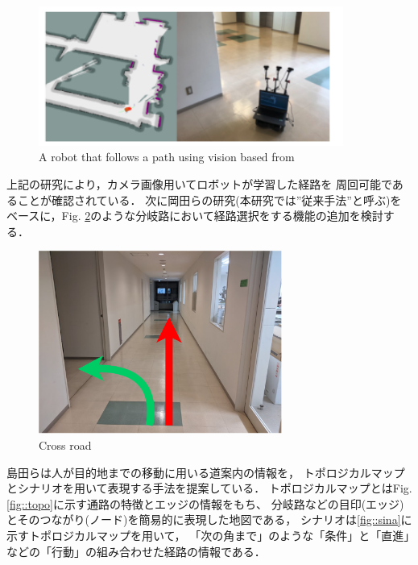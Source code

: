 \begin{figure}[h]
    \centering
    \includegraphics[width = 10cm]{./figs/okada.png}
    \caption{A robot that follows a path using vision based from \cite{okada}}
    \label{fig::okada}
\end{figure}

\newpage
上記の研究により，カメラ画像用いてロボットが学習した経路を
周回可能であることが確認されている．
次に岡田ら\cite{okada}の研究(本研究では”従来手法”と呼ぶ)をベースに，Fig. \ref{fig::bunki}のような分岐路において経路選択をする機能の追加を検討する．
 \vspace{4.0zh}
\begin{figure}[h]
    \centering
    \includegraphics[width = 8cm]{./figs/bunki.pdf}
    \caption{Cross road}
    \label{fig::bunki}
\end{figure}
\newpage
島田らは人が目的地までの移動に用いる道案内の情報を，
トポロジカルマップとシナリオを用いて表現する手法を提案している．
トポロジカルマップとはFig. \ref{fig::topo}に示す通路の特徴とエッジの情報をもち、
分岐路などの目印(エッジ)とそのつながり(ノード)を簡易的に表現した地図である，
シナリオは\ref{fig::sina}に示すトポロジカルマップを用いて，
「次の角まで」のような「条件」と「直進」などの「行動」の組み合わせた経路の情報である．
